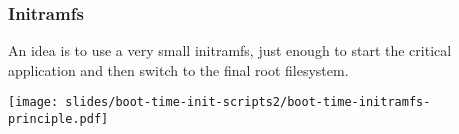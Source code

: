 \begin{frame}
\frametitle{Initramfs}
An idea is to use a very small initramfs, just enough to start the critical
application and then switch to the final root filesystem.
\begin{center}
    \texttt{[image: slides/boot-time-init-scripts2/boot-time-initramfs-principle.pdf]}
\end{center}
\end{frame}
